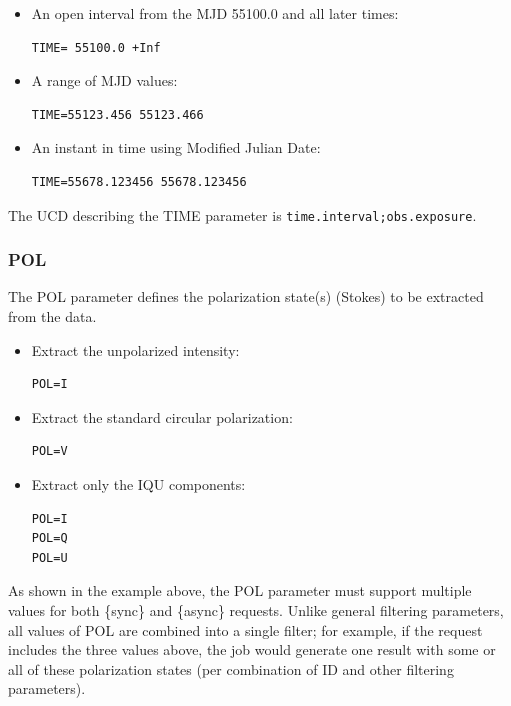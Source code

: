\documentclass[11pt,a4paper]{ivoa}
\newcommand{\ucd}[1]{\texttt{#1}}
\begin{document}
\begin{itemize}
\item An open interval from the MJD 55100.0 and all later times:

\begin{lstlisting}
TIME= 55100.0 +Inf
\end{lstlisting}

\item A range of MJD values:

\begin{lstlisting}
TIME=55123.456 55123.466
\end{lstlisting}

\item An instant in time using Modified Julian Date:

\begin{lstlisting}
TIME=55678.123456 55678.123456
\end{lstlisting}
\end{itemize}

The UCD describing the TIME parameter is
\ucd{time.interval;obs.exposure}.


\subsubsection{POL}
\label{sec:POL}

The POL parameter defines the polarization state(s) (Stokes)
to be extracted from the data.

\begin{itemize}
\item Extract the unpolarized intensity:
\begin{lstlisting}
POL=I
\end{lstlisting}
\item Extract the standard circular polarization:
\begin{lstlisting}
POL=V
\end{lstlisting}

\item Extract only the IQU components:
\begin{lstlisting}
POL=I
POL=Q
POL=U
\end{lstlisting}
\end{itemize}

As shown in the example above, the POL parameter must support multiple values 
for both \{sync\} and \{async\} requests.  Unlike general filtering parameters, 
all values of POL are combined into a single filter; for example, if the request
includes the three values above, the job would generate one result with
some or all of these polarization states (per combination of ID and
other filtering parameters).
\end{document}
